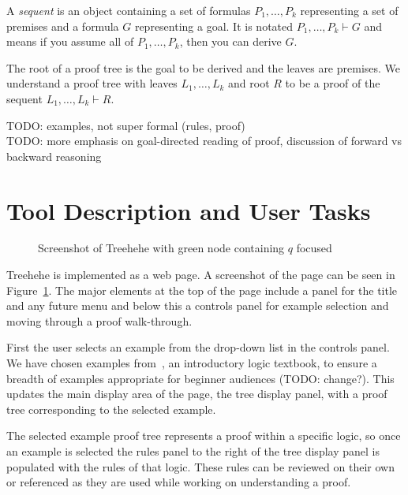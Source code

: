 \documentclass[conference]{IEEEtran}
\newcommand{\projectname}{Treehehe}
\begin{document}
A \textit{sequent} is an object containing a set of formulas $P_1, \dots, P_k$ representing a set of premises and a formula $G$ representing a goal. It is notated $P_1, \dots, P_k \vdash G$ and means if you assume all of $P_1, \dots, P_k$, then you can derive $G$.

The root of a proof tree is the goal to be derived and the leaves are premises. We understand a proof tree with leaves $L_1, \dots, L_k$ and root $R$ to be a proof of the sequent $L_1, \dots, L_k \vdash R$.



TODO: examples, not super formal (rules, proof) \\

TODO: more emphasis on goal-directed reading of proof, discussion of forward vs backward reasoning \\


\section{Tool Description and User Tasks}
\label{sec:tooldesc}

\begin{figure}

\begin{center}
\end{center}

\caption{Screenshot of \projectname{} with green node containing $q$ focused}
\label{fig:screenshot}

\end{figure}

\projectname{} is implemented as a web page. A screenshot of the page can be seen in Figure~\ref{fig:screenshot}. The major elements at the top of the page include a panel for the title and any future menu and below this a controls panel for example selection and moving through a proof walk-through.

First the user selects an example from the drop-down list in the controls panel. We have chosen examples from~\cite{logicincs-huth+ryan}, an introductory logic textbook, to ensure a breadth of examples appropriate for beginner audiences (TODO: change?). This updates the main display area of the page, the tree display panel, with a proof tree corresponding to the selected example.

The selected example proof tree represents a proof within a specific logic, so once an example is selected the rules panel to the right of the tree display panel is populated with the rules of that logic. These rules can be reviewed on their own or referenced as they are used while working on understanding a proof.
\end{document}
